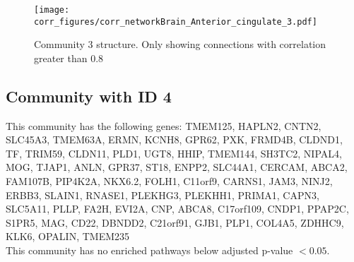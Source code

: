 \begin{figure}[h!]
\centering
\texttt{[image: corr\_figures/corr\_networkBrain\_Anterior\_cingulate\_3.pdf]}
\caption{Community 3 structure. Only showing connections with correlation greater than 0.8}
\end{figure}




\subsection*{Community with ID 4}
This community has the following genes: TMEM125, HAPLN2, CNTN2, SLC45A3, TMEM63A, ERMN, KCNH8, GPR62, PXK, FRMD4B, CLDND1, TF, TRIM59, CLDN11, PLD1, UGT8, HHIP, TMEM144, SH3TC2, NIPAL4, MOG, TJAP1, ANLN, GPR37, ST18, ENPP2, SLC44A1, CERCAM, ABCA2, FAM107B, PIP4K2A, NKX6.2, FOLH1, C11orf9, CARNS1, JAM3, NINJ2, ERBB3, SLAIN1, RNASE1, PLEKHG3, PLEKHH1, PRIMA1, CAPN3, SLC5A11, PLLP, FA2H, EVI2A, CNP, ABCA8, C17orf109, CNDP1, PPAP2C, S1PR5, MAG, CD22, DBNDD2, C21orf91, GJB1, PLP1, COL4A5, ZDHHC9, KLK6, OPALIN, TMEM235
\\
This community has no enriched pathways below adjusted p-value $< 0.05$.

